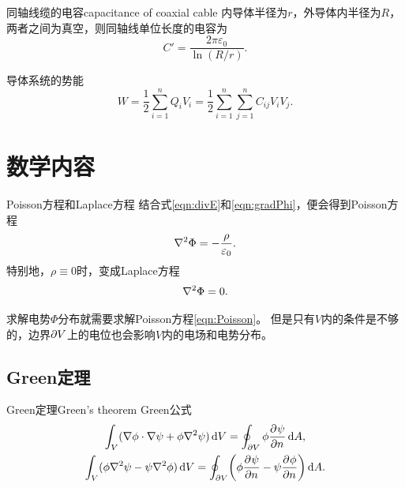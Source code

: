\begin{example}
    {同轴线缆的电容}{capacitance of coaxial cable}
    内导体半径为$r$，外导体内半径为$R$，两者之间为真空，则同轴线单位长度的电容为
    \begin{equation}
        C' = \frac{2\pi\varepsilon_0}{\ln(R/r)}.
    \end{equation}
\end{example}

导体系统的势能
\begin{equation}
    \label{eq:ed-capacitance-energy}
    W = \frac12\sum_{i=1}^nQ_iV_i = \frac12\sum_{i=1}^n\sum_{j=1}^nC_{ij}V_iV_j.
\end{equation}

\section{数学内容}

\begin{definition}
    {Poisson方程和Laplace方程}{}
    结合式\eqref{eqn:divE}和\eqref{eqn:gradPhi}，便会得到Poisson方程
    \begin{equation}
        \label{eqn:Poisson}
        \nabla^2\Phi = -\frac\rho{\varepsilon_0}.
    \end{equation}
    特别地，$\rho \equiv 0$时，变成Laplace方程
    \begin{equation}
        \label{eqn:Laplace}
        \nabla^2\Phi = 0.
    \end{equation}
\end{definition}
求解电势$\Phi$分布就需要求解Poisson方程\eqref{eqn:Poisson}。
但是只有$V$内的条件是不够的，边界$\partial V$上的电位也会影响$V$内的电场和电势分布。

\subsection{Green定理}

\begin{theorem}{Green定理}{Green's theorem}
    Green公式
    \begin{subequations}
        \label{eqn:Green}
        \begin{gather}
            \label{eqn:Green I}
            \int_V(\nabla\phi \cdot \nabla\psi + \phi\nabla^2\psi)\mathop{}\!\mathrm{d} V = \oint_{\partial V}\phi\frac{\partial^{}\psi}{\partial{n}^{}}\mathop{}\!\mathrm{d} A,\\
            \label{eqn:Green II}
            \int_V(\phi\nabla^2\psi - \psi\nabla^2\phi)\mathop{}\!\mathrm{d} V = \oint_{\partial V}\biggl(\phi\frac{\partial^{}\psi}{\partial{n}^{}} - \psi\frac{\partial^{}\phi}{\partial{n}^{}}\biggr)\mathop{}\!\mathrm{d} A.
        \end{gather}
    \end{subequations}
\end{theorem}

